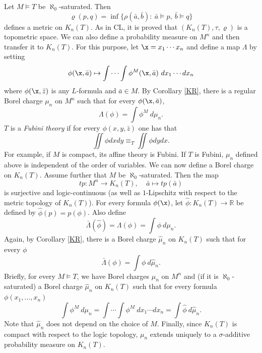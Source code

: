 \documentclass[12pt]{article}
\newtheorem{lemma}[theorem]{Lemma}
\def\a{\bar {a}}\def\b{\bar {b}}\def\c{\bar {c}}
\def\z{\bar {z}}\def\t{\bar {t}}\def\r{\bar {r}}
\def\Rn{\mathbb R}
\begin{document}
Let $M\vDash T$ be $\aleph_0$-saturated. Then $$\varrho(p,q)=\inf\{\rho(\a,\b):\ \a\vDash p,\ \b\vDash q\}$$
defines a metric on $K_n(T)$. As in CL, it is proved that $(K_n(T),\tau,\varrho)$ is a topometric space.
We can also define a probability measure on $M^n$ and then transfer it to $K_n(T)$.
For this purpose, let $\x=x_1\cdots x_n$ and define a map $\Lambda$ by setting
$$\phi(\x,\a)\mapsto\int\cdots\int\phi^M(\x,\a)\ dx_1\cdots dx_n$$
where $\phi(\x,\z)$ is any $L$-formula and $\a\in M$.
By Corollary \ref{KR}, there is a regular Borel charge $\mu_n$ on $M^n$ such that for every $\phi(\x,\a)$,
$$\Lambda(\phi)=\int\phi^M\ d\mu_n.$$
$T$ is a \emph{Fubini theory} if for every $\phi(x,y,\z)$ one has that $$\iint\phi dxdy\equiv_T\iint\phi dydx.$$
For example, if $M$ is compact, its affine theory is Fubini.
If $T$ is Fubini, $\mu_n$ defined above is independent of the order of variables.
We can now define a Borel charge on $K_n(T)$. Assume further that $M$ be $\aleph_0$-saturated.
Then the map $$tp:M^n\rightarrow K_n(T),\ \ \ \ \ \a\mapsto tp(\a)$$
is surjective and logic-continuous (as well as $1$-Lipschitz with respect to the metric topology of $K_n(T)$).
For every formula $\phi(\x)$, let $\hat{\phi}:K_n(T)\rightarrow\Rn$ be defined by $\hat\phi(p)=p(\phi)$.
Also define $$\bar\Lambda(\hat{\phi})=\Lambda(\phi)=\int\phi\ d\mu_n.$$
Again, by Corollary \ref{KR}, there is a Borel charge $\hat\mu_n$ on $K_n(T)$
such that for every $\phi$ $$\bar\Lambda(\phi)=\int\phi\ d\hat\mu_n.$$
Briefly, for every $M\vDash T$, we have Borel charges $\mu_n$ on $M^n$ and (if it is $\aleph_0$-saturated)
a Borel charge $\hat\mu_n$ on $K_n(T)$ such that for every formula $\phi(x_1,...,x_n)$
$$\int\phi^M\ d\mu_n=\int\cdots\int\phi^M\ dx_1\cdots dx_n=\int\hat\phi\ d\hat\mu_n.$$
Note that $\hat\mu_n$ does not depend on the choice of $M$.
Finally, since $K_n(T)$ is compact with respect to the logic topology, $\mu_n$ extends uniquely to a
$\sigma$-additive probability measure on $K_n(T)$.
\end{document}

